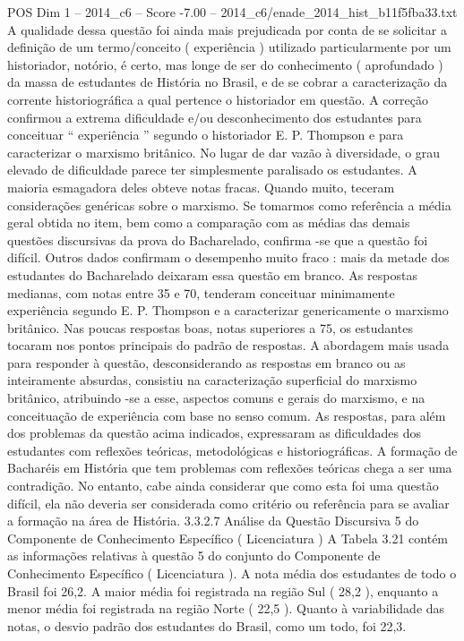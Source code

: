 \begin{textsample}{POS Dim 1 – 2014\_c6 – Score -7.00 – 2014\_c6/enade\_2014\_hist\_b11f5fba33.txt}
A qualidade dessa questão foi ainda mais prejudicada por conta de se solicitar a definição de um termo/conceito ( experiência ) utilizado particularmente por um historiador, notório, é certo, mas longe de ser do conhecimento ( aprofundado ) da massa de estudantes de História no Brasil, e de se cobrar a caracterização da corrente historiográfica a qual pertence o historiador em questão.
A correção confirmou a extrema dificuldade e/ou desconhecimento dos estudantes para conceituar “ experiência ” segundo o historiador E.
P.
Thompson e para caracterizar o marxismo britânico.
No lugar de dar vazão à diversidade, o grau elevado de dificuldade parece ter simplesmente paralisado os estudantes.
A maioria esmagadora deles obteve notas fracas.
Quando muito, teceram considerações genéricas sobre o marxismo.
Se tomarmos como referência a média geral obtida no item, bem como a comparação com as médias das demais questões discursivas da prova do Bacharelado, confirma -se que a questão foi difícil.
Outros dados confirmam o desempenho muito fraco : mais da metade dos estudantes do Bacharelado deixaram essa questão em branco.
As respostas medianas, com notas entre 35 e 70, tenderam conceituar minimamente experiência segundo E.
P.
Thompson e a caracterizar genericamente o marxismo britânico.
Nas poucas respostas boas, notas superiores a 75, os estudantes tocaram nos pontos principais do padrão de respostas.
A abordagem mais usada para responder à questão, desconsiderando as respostas em branco ou as inteiramente absurdas, consistiu na caracterização superficial do marxismo britânico, atribuindo -se a esse, aspectos comuns e gerais do marxismo, e na conceituação de experiência com base no senso comum.
As respostas, para além dos problemas da questão acima indicados, expressaram as dificuldades dos estudantes com reflexões teóricas, metodológicas e historiográficas.
A formação de Bacharéis em História que tem problemas com reflexões teóricas chega a ser uma contradição.
No entanto, cabe ainda considerar que como esta foi uma questão difícil, ela não deveria ser considerada como critério ou referência para se avaliar a formação na área de História. 3.3.2.7 Análise da Questão Discursiva 5 do Componente de Conhecimento Específico ( Licenciatura ) A Tabela 3.21 contém as informações relativas à questão 5 do conjunto do Componente de Conhecimento Específico ( Licenciatura ).
A nota média dos estudantes de todo o Brasil foi 26,2.
A maior média foi registrada na região Sul ( 28,2 ), enquanto a menor média foi registrada na região Norte ( 22,5 ).
Quanto à variabilidade das notas, o desvio padrão dos estudantes do Brasil, como um todo, foi 22,3.

\end{textsample}
